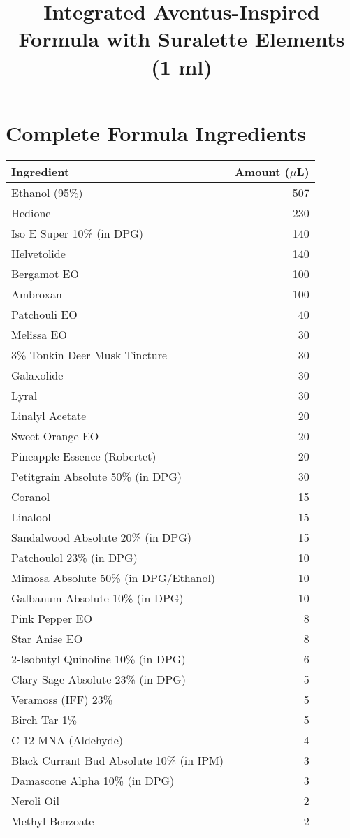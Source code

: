 \documentclass{article}
\title{Integrated Aventus-Inspired Formula with Suralette Elements (1 ml)}
\author{}
\date{}
\begin{document}
\maketitle

\section{Complete Formula Ingredients}

\begin{table}[h]
\centering
\begin{tabular}{lr}
\toprule
\textbf{Ingredient} & \textbf{Amount ($\mu$L)} \\
\midrule
Ethanol (95\%) & 507 \\
Hedione & 230 \\
Iso E Super 10\% (in DPG) & 140 \\
Helvetolide & 140 \\
Bergamot EO & 100 \\
Ambroxan & 100 \\
Patchouli EO & 40 \\
Melissa EO & 30 \\
3\% Tonkin Deer Musk Tincture & 30 \\
Galaxolide & 30 \\
Lyral & 30 \\
Linalyl Acetate & 20 \\
Sweet Orange EO & 20 \\
Pineapple Essence (Robertet) & 20 \\
Petitgrain Absolute 50\% (in DPG) & 30 \\
Coranol & 15 \\
Linalool & 15 \\
Sandalwood Absolute 20\% (in DPG) & 15 \\
Patchoulol 23\% (in DPG) & 10 \\
Mimosa Absolute 50\% (in DPG/Ethanol) & 10 \\
Galbanum Absolute 10\% (in DPG) & 10 \\
Pink Pepper EO & 8 \\
Star Anise EO & 8 \\
2-Isobutyl Quinoline 10\% (in DPG) & 6 \\
Clary Sage Absolute 23\% (in DPG) & 5 \\
Veramoss (IFF) 23\% & 5 \\
Birch Tar 1\% & 5 \\
C-12 MNA (Aldehyde) & 4 \\
Black Currant Bud Absolute 10\% (in IPM) & 3 \\
Damascone Alpha 10\% (in DPG) & 3 \\
Neroli Oil & 2 \\
Methyl Benzoate & 2 \\
\bottomrule
\end{tabular}
\end{table}
\end{document}

